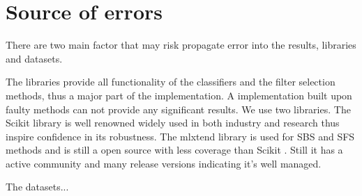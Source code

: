 \section{Source of errors}
\label{sec:source_of_errors}

There are two main factor that may risk propagate error into the results, libraries and datasets.

The libraries provide all functionality of the classifiers and the filter selection methods, thus a major part of the implementation. A implementation built upon faulty methods can not provide any significant results. We use two libraries. The Scikit library \parencite{scikit-learn} is well renowned widely used in both industry and research thus inspire confidence in its robustness. The mlxtend library is used for SBS and SFS methods and is still a open source with less coverage than Scikit \parencite{mlextend}. Still it has a active community and many release versions indicating it's well managed.

The datasets...
